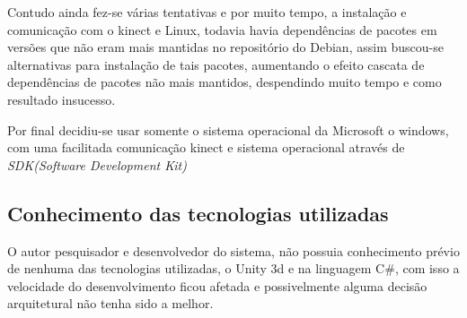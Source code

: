   Contudo ainda fez-se várias tentativas e por muito tempo,
a instalação e comunicação com o kinect e Linux, todavia havia dependências de pacotes em versões que não eram mais
mantidas no repositório do Debian, assim buscou-se alternativas para instalação de tais pacotes, aumentando o efeito cascata
de dependências de pacotes não mais mantidos, despendindo muito tempo e como resultado insucesso.

  Por final decidiu-se usar somente o sistema operacional da Microsoft o windows, com uma facilitada comunicação
kinect e sistema operacional através de \textit{SDK(Software Development Kit)}


\subsection{Conhecimento das tecnologias utilizadas}\label{pro:conhecimento}
  O autor pesquisador e desenvolvedor do sistema, não possuia conhecimento prévio de nenhuma das
tecnologias utilizadas, o Unity 3d e na linguagem C\#, com isso a velocidade do desenvolvimento ficou afetada
e possivelmente alguma decisão arquitetural não tenha sido a melhor.
